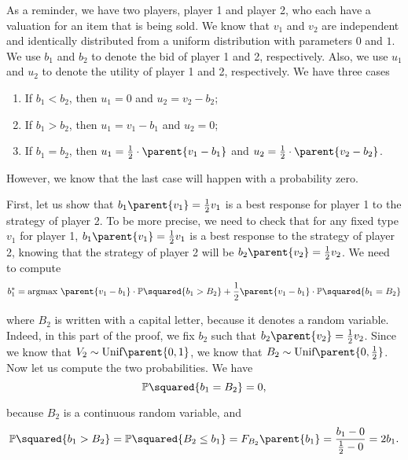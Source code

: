 As a reminder, we have two players, player 1 and player 2, who each have a valuation for an item that is being sold. We know that $v_1$ and $v_2$ are independent and identically distributed from a uniform distribution with parameters $0$ and $1$. We use $b_1$ and $b_2$ to denote the bid of player 1 and 2, respectively. Also, we use $u_1$ and $u_2$ to denote the utility of player 1 and 2, respectively. We have three cases
\begin{enumerate}
    \item If $b_1 < b_2$, then $u_1 = 0$ and $u_2 = v_2 - b_2$;
    \item If $b_1 > b_2$, then $u_1 = v_1 - b_1$ and $u_2 = 0$;
    \item If $b_1 = b_2$, then $u_1 = \frac{1}{2} \cdot \parent{v_1 - b_1}$ and $u_2 = \frac{1}{2} \cdot \parent{v_2 - b_2}$.
\end{enumerate}

However, we know that the last case will happen with a probability zero.

\vspace{5mm}


First, let us show that $b_1 \parent{v_1} = \frac{1}{2} v_1$ is a best response for player 1 to the strategy of player 2. To be more precise, we need to check that for any fixed type $v_1$ for player 1, $b_1 \parent{v_1} = \frac{1}{2} v_1$ is a best response to the strategy of player 2, knowing that the strategy of player 2 will be $b_2 \parent{v_2} = \frac{1}{2} v_2$.
We need to compute
\begin{equation*}
    b_1^{*}
    = \text{argmax} \ 
    \parent{v_1 - b_1} \cdot \mathbb{P} \squared{b_1 > B_2}
    + \dfrac{1}{2} \parent{v_1 - b_1} \cdot \mathbb{P} \squared{b_1 = B_2}
\end{equation*}

where $B_2$ is written with a capital letter, because it denotes a random variable. Indeed, in this part of the proof, we fix $b_2$ such that $b_2 \parent{v_2} = \frac{1}{2} v_2$. Since we know that $V_2 \sim \text{Unif} \parent{0, 1}$, we know that $B_2 \sim \text{Unif} \parent{0, \frac{1}{2}}$. Now let us compute the two probabilities. We have
\begin{equation*}
    \mathbb{P} \squared{b_1 = B_2}
    = 0,
\end{equation*}

because $B_2$ is a continuous random variable, and
\begin{equation*}
    \mathbb{P} \squared{b_1 > B_2}
    = \mathbb{P} \squared{B_2 \leq b_1}
    = F_{B_2} \parent{b_1}
    = \dfrac{b_1 - 0}{\frac{1}{2} - 0}
    = 2 b_1.
\end{equation*}



